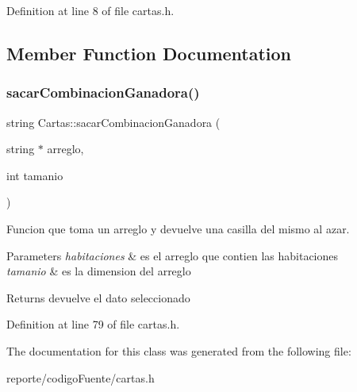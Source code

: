 Definition at line 8 of file cartas.\+h.



\subsection{Member Function Documentation}
\mbox{\label{class_cartas_a167c673371f5c944b845c5cf01990a59}} 
\subsubsection{\texorpdfstring{sacar\+Combinacion\+Ganadora()}{sacarCombinacionGanadora()}}
{\footnotesize\ttfamily string Cartas\+::sacar\+Combinacion\+Ganadora (\begin{DoxyParamCaption}\item[{string $\ast$}]{arreglo,  }\item[{int}]{tamanio }\end{DoxyParamCaption})\hspace{0.3cm}{\ttfamily [inline]}}



Funcion que toma un arreglo y devuelve una casilla del mismo al azar. 


\begin{DoxyParams}{Parameters}
{\em habitaciones} & es el arreglo que contien las habitaciones \\
\hline
{\em tamanio} & es la dimension del arreglo \\
\hline
\end{DoxyParams}
\begin{DoxyReturn}{Returns}
devuelve el dato seleccionado 
\end{DoxyReturn}


Definition at line 79 of file cartas.\+h.



The documentation for this class was generated from the following file\+:\begin{DoxyCompactItemize}
\item 
reporte/codigo\+Fuente/cartas.\+h\end{DoxyCompactItemize}
